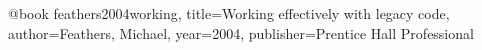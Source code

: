 


@book{ 	feathers2004working,
  		title={Working effectively with legacy code},
		author={Feathers, Michael},
		year={2004},
		publisher={Prentice Hall Professional}
}